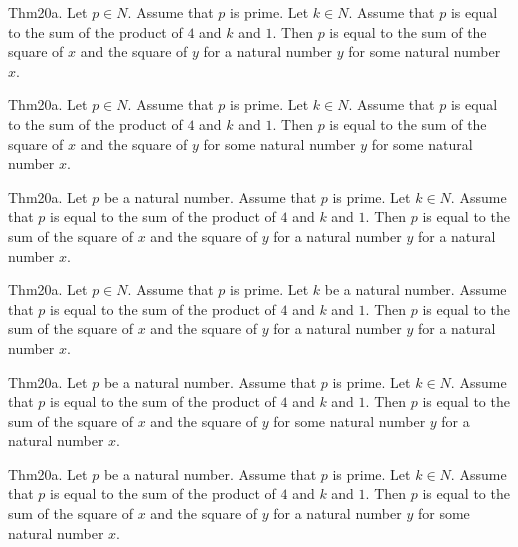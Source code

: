 \documentclass{article}
\begin{document}
Thm20a. Let $p \in N$. Assume that $p$ is prime. Let $k \in N$. Assume that $p$ is equal to the sum of the product of $4$ and $k$ and $1$. Then $p$ is equal to the sum of the square of $x$ and the square of $y$ for a natural number $y$ for some natural number $x$.

Thm20a. Let $p \in N$. Assume that $p$ is prime. Let $k \in N$. Assume that $p$ is equal to the sum of the product of $4$ and $k$ and $1$. Then $p$ is equal to the sum of the square of $x$ and the square of $y$ for some natural number $y$ for some natural number $x$.

Thm20a. Let $p$ be a natural number. Assume that $p$ is prime. Let $k \in N$. Assume that $p$ is equal to the sum of the product of $4$ and $k$ and $1$. Then $p$ is equal to the sum of the square of $x$ and the square of $y$ for a natural number $y$ for a natural number $x$.

Thm20a. Let $p \in N$. Assume that $p$ is prime. Let $k$ be a natural number. Assume that $p$ is equal to the sum of the product of $4$ and $k$ and $1$. Then $p$ is equal to the sum of the square of $x$ and the square of $y$ for a natural number $y$ for a natural number $x$.

Thm20a. Let $p$ be a natural number. Assume that $p$ is prime. Let $k \in N$. Assume that $p$ is equal to the sum of the product of $4$ and $k$ and $1$. Then $p$ is equal to the sum of the square of $x$ and the square of $y$ for some natural number $y$ for a natural number $x$.

Thm20a. Let $p$ be a natural number. Assume that $p$ is prime. Let $k \in N$. Assume that $p$ is equal to the sum of the product of $4$ and $k$ and $1$. Then $p$ is equal to the sum of the square of $x$ and the square of $y$ for a natural number $y$ for some natural number $x$.
\end{document}
